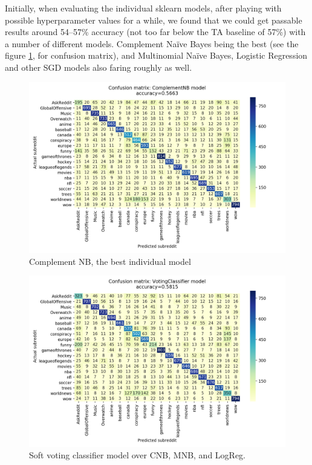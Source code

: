 \documentclass[letterpaper, 11pt]{article}
\begin{document}
Initially, when evaluating the individual sklearn models, after playing with possible hyperparameter values for a while, we found that we could get passable results around 54--57\% accuracy (not too far below the TA baseline of 57\%) with a number of different models. Complement Na\"ive Bayes being the best (see the figure \ref{fig:complnb}, for confusion matrix), and Multinomial Na\"ive Bayes, Logistic Regression and other SGD models also faring roughly as well.
\begin{figure}
    \centering
    \includegraphics[width=\textwidth/2]{images/complementnb}
    \caption{Complement NB, the best individual model}
    \label{fig:complnb}
\end{figure}
\begin{figure}
    \centering
    \includegraphics[width=\textwidth/2]{images/best-model}
    \caption{Soft voting classifier model over CNB, MNB, and LogReg.}
    \label{fig:votingclf}
\end{figure}
\end{document}

